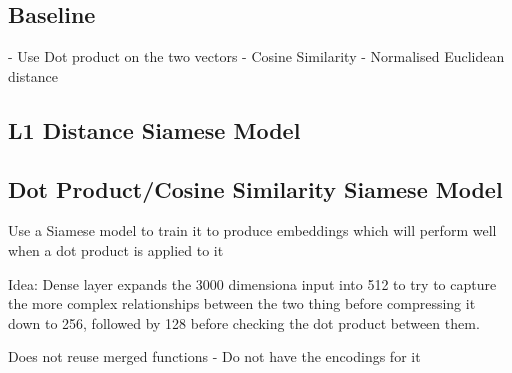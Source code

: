\subsection{Baseline}
 - Use Dot product on the two vectors
 - Cosine Similarity
 - Normalised Euclidean distance

\subsection{L1 Distance Siamese Model}
 
\subsection{Dot Product/Cosine Similarity Siamese Model}
Use a Siamese model to train it to produce embeddings which will perform well when a dot product is applied to it

Idea: Dense layer expands the 3000 dimensiona input into 512 to try to capture the more complex relationships between the two thing before compressing it down to 256, followed by 128 before checking the dot product between them.




Does not reuse merged functions - Do not have the encodings for it